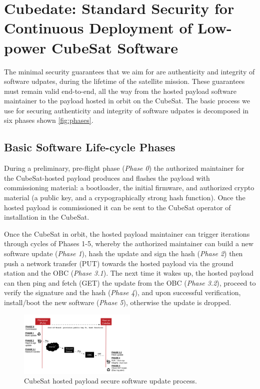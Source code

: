 \section{Cubedate: Standard Security for Continuous Deployment of Low-power CubeSat Software}
\label{sec:low-power-orbital-communication-arch}


The minimal security guarantees that we aim for are authenticity and integrity of software udpates, during the lifetime of the satellite mission.
These guarantees must remain valid end-to-end, all the way from the hosted payload software maintainer to the payload hosted in orbit on the CubeSat.
The basic process we use for securing authenticity and integrity of software udpates is decomposed in six phases shown \autoref{fig:phases}. 

\subsection{Basic Software Life-cycle Phases}

During a preliminary, pre-flight phase (\textit{Phase 0}) the authorized maintainer for the CubeSat-hosted payload
produces and flashes the payload with commissioning material:
a bootloader, the initial firmware, and authorized crypto material (a public key, and a crypographically strong hash function).
Once the hosted payload is commissioned it can be sent to the CubeSat operator of installation in the CubeSat.


Once the CubeSat in orbit, the hosted payload maintainer can trigger iterations through cycles of Phases 1-5, whereby
the authorized maintainer can build a new software update (\textit{Phase 1}), hash the update
and sign the hash (\textit{Phase 2}) then push a network transfer (PUT) towards the hosted payload via the ground station and the OBC (\textit{Phase 3.1}). The next time it wakes up, the hosted payload can
then ping and fetch (GET) the update from the OBC (\textit{Phase 3.2}), proceed to verify the signature and the hash (\textit{Phase 4}),
and upon successful verification, install/boot the new software (\textit{Phase 5}), otherwise the update is dropped.

\begin{figure}[t]
    \centering
    \includegraphics[width=0.5\textwidth]{Figures/CubeSat-Payload-update.png}
    \caption{CubeSat hosted payload secure software update process.}
    \label{fig:phases}
\end{figure}

